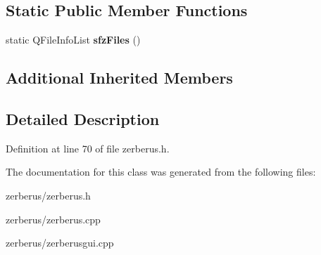\subsection*{Static Public Member Functions}
\begin{DoxyCompactItemize}
\item 
\mbox{\label{class_zerberus_af70f3ce2151afb7fb5f052e784dec813}} 
static Q\+File\+Info\+List {\bfseries sfz\+Files} ()
\end{DoxyCompactItemize}
\subsection*{Additional Inherited Members}


\subsection{Detailed Description}


Definition at line 70 of file zerberus.\+h.



The documentation for this class was generated from the following files\+:\begin{DoxyCompactItemize}
\item 
zerberus/zerberus.\+h\item 
zerberus/zerberus.\+cpp\item 
zerberus/zerberusgui.\+cpp\end{DoxyCompactItemize}
